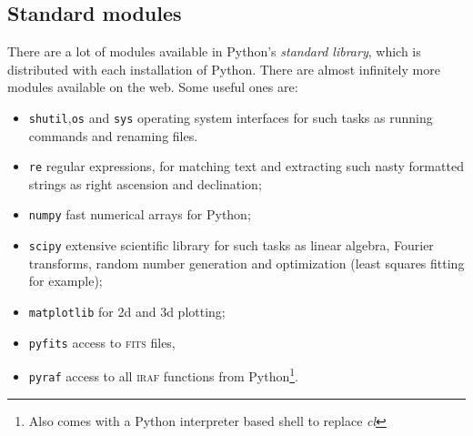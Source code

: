 \documentclass[10pt,a4paper]{article}
\begin{document}
\subsection{Standard modules}
There are a lot of modules available in Python's \emph{standard library}, which is distributed with each installation of Python. There are almost infinitely more modules available on the web.
Some useful ones are:
\begin{itemize}
\item \verb|shutil|,\verb|os| and \verb|sys| operating system interfaces for such tasks as running commands and renaming files.
\item \verb|re| regular expressions, for matching text and extracting such nasty formatted strings as right ascension and declination;
\item \verb|numpy| fast numerical arrays for Python;
\item \verb|scipy| extensive scientific library for such tasks as linear algebra, Fourier transforms, random number generation and optimization (least squares fitting for example);
\item \verb|matplotlib| for 2d and 3d plotting;
\item \verb|pyfits| access to \textsc{fits} files,
\item \verb|pyraf| access to all \textsc{iraf} functions from Python\footnote{Also comes with a Python interpreter based shell to replace \emph{cl}}.
\end{itemize}
\end{document}
